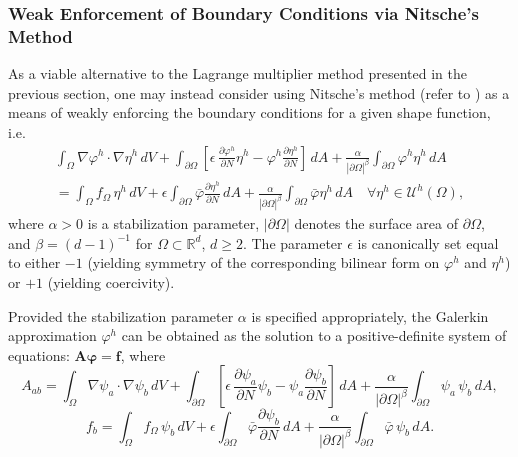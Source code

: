	\subsubsection*{Weak Enforcement of Boundary Conditions via Nitsche's Method}
	
	As a viable alternative to the Lagrange multiplier method presented in the previous section, one may instead consider using Nitsche's method (refer to \cite{Juntunen&Stenberg:09}) as a means of weakly enforcing the boundary conditions for a given shape function, i.e.
	\begin{eqnarray}
		\int_{\Omega} \nabla \varphi^h \cdot \nabla \eta^h \, dV + \int_{\partial \Omega} \left[ \epsilon \, \frac{\partial \varphi^h}{\partial N} \eta^h - \varphi^h \frac{\partial \eta^h}{\partial N} \right] \, dA + \frac{\alpha}{|\partial \Omega|^{\beta}} \int_{\partial \Omega} \varphi^h \eta^h \, dA \nonumber \\ = \int_\Omega f_\Omega \, \eta^h \, dV + \epsilon \int_{\partial \Omega} \bar{\varphi} \frac{\partial \eta^h}{\partial N} \, dA + \frac{\alpha}{|\partial \Omega|^{\beta}} \int_{\partial \Omega} \bar{\varphi} \eta^h \, dA \quad \forall \eta^h \in \mathcal{U}^h (\Omega),
	\end{eqnarray}
	where $\alpha > 0$ is a stabilization parameter, $| \partial \Omega |$ denotes the surface area of $\partial \Omega$, and $\beta = (d-1)^{-1}$ for $\Omega \subset \mathbb{R}^d$, $d \geq 2$. The parameter $\epsilon$ is canonically set equal to either $-1$ (yielding symmetry of the corresponding bilinear form on $\varphi^h$ and $\eta^h$) or $+1$ (yielding coercivity).
	
	Provided the stabilization parameter $\alpha$ is specified appropriately, the Galerkin approximation $\varphi^h$ can be obtained as the solution to a positive-definite system of equations: $\mathbf{A} \boldsymbol{\varphi} = \mathbf{f}$, where
	\begin{equation}
		A_{ab} = \int_{\Omega} \nabla \psi_a \cdot \nabla \psi_b \, dV + \int_{\partial \Omega} \left[ \epsilon \, \frac{\partial \psi_a}{\partial N} \psi_b - \psi_a \frac{\partial \psi_b}{\partial N} \right] \, dA + \frac{\alpha}{|\partial \Omega|^{\beta}} \int_{\partial \Omega} \psi_a \, \psi_b \, dA,
	\end{equation}
	\begin{equation}
		f_{b} = \int_{\Omega} f_\Omega \, \psi_b \, dV + \epsilon \int_{\partial \Omega} \bar{\varphi} \frac{\partial \psi_b}{\partial N} \, dA + \frac{\alpha}{|\partial \Omega|^{\beta}} \int_{\partial \Omega} \bar{\varphi} \, \psi_b \, dA.
	\end{equation}
	
